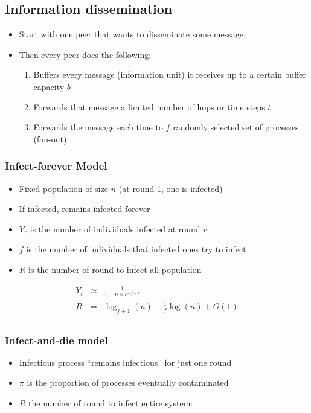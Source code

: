 \subsection{Information dissemination}

\begin{itemize}
\item Start with one peer that wants to disseminate some message.
\item Then every peer does the following:

\begin{enumerate}
	\item Buffers every message (information unit) it receives up to a
	certain buffer capacity $b$
	\item Forwards that message a limited number of hops or time steps $t$
	\item Forwards the message each time to $f$ randomly selected set of
	processes (fan-out)
\end{enumerate}
\end{itemize}

\subsubsection{Infect-forever Model}
\begin{itemize}
	\item Fixed population of size $n$ (at round 1, one is infected)
	\item If infected, remains infected forever
	\item $Y_r$ is the number of individuals infected at round $r$
	\item $f$ is the number of individuals that infected ones try to infect
    \item $R$ is the number of round to infect all population
\end{itemize}

\begin{eqnarray*}
Y_r &\approx& \frac{1}{1+n \times e^{-f \times r}}\\
R &=& \log_{f+1}(n)+\frac{1}{f}\log(n)+O(1)\\
\end{eqnarray*}

\subsubsection{Infect-and-die model}

\begin{itemize}
\item Infectious process \enquote{remains infectious} for just one round
\item $\pi$ is the proportion of processes eventually contaminated
\item $R$ the number of round to infect entire system:
\end{itemize}

